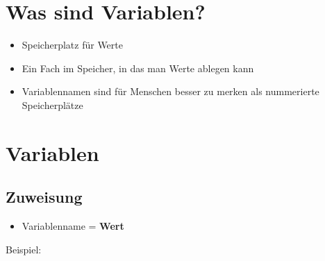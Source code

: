 



\subtitle{Kapitel 3: Daten Zwischenspeichern}
\maketitle

\section{Was sind Variablen?}
\begin{frame}[fragile]
    \slidehead
    \begin{itemize}
        \item Speicherplatz für Werte
            \pause
        \item Ein Fach im Speicher, in das man Werte ablegen kann
            \pause
        \item Variablennamen sind für Menschen besser zu merken als nummerierte Speicherplätze
    \end{itemize}
\end{frame}

\section{Variablen}
\subsection{Zuweisung}
\begin{frame}
    \slidehead
    \begin{itemize}
        \item Variablenname = \textbf{Wert}
    \end{itemize}
    \pause
    Beispiel:
\end{frame}

